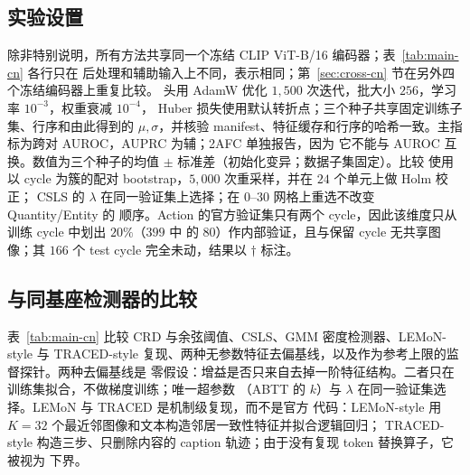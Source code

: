 \documentclass[10pt,twocolumn,a4paper]{ctexart}
\begin{document}
\subsection{实验设置}
除非特别说明，所有方法共享同一个冻结 CLIP ViT-B/16 编码器；表~\ref{tab:main-cn} 各行只在
后处理和辅助输入上不同，表示相同；第~\ref{sec:cross-cn} 节在另外四个冻结编码器上重复比较。
头用 AdamW 优化 $1{,}500$ 次迭代，批大小 $256$，学习率 $10^{-3}$，权重衰减 $10^{-4}$，
Huber 损失使用默认转折点；三个种子共享固定训练子集、行序和由此得到的 $\mu,\sigma$，并核验
manifest、特征缓存和行序的哈希一致。主指标为跨对 AUROC，AUPRC 为辅；2AFC 单独报告，因为
它不能与 AUROC 互换。数值为三个种子的均值 $\pm$ 标准差（初始化变异；数据子集固定）。比较
使用以 cycle 为簇的配对 bootstrap，$5{,}000$ 次重采样，并在 $24$ 个单元上做 Holm 校正；
CSLS 的 $\lambda$ 在同一验证集上选择；在 $0$--$30$ 网格上重选不改变 Quantity/Entity 的
顺序。Action 的官方验证集只有两个 cycle，因此该维度只从训练 cycle 中划出 $20\%$（$399$ 中
的 $80$）作内部验证，且与保留 cycle 无共享图像；其 $166$ 个 test cycle 完全未动，结果以
$\dagger$ 标注。

\subsection{与同基座检测器的比较}
表~\ref{tab:main-cn} 比较 CRD 与余弦阈值、CSLS、GMM 密度检测器、LEMoN-style 与
TRACED-style 复现、两种无参数特征去偏基线，以及作为参考上限的监督探针。两种去偏基线是
零假设：增益是否只来自去掉一阶特征结构。二者只在训练集拟合，不做梯度训练；唯一超参数
（ABTT 的 $k$）与 $\lambda$ 在同一验证集选择。LEMoN 与 TRACED 是机制级复现，而不是官方
代码：LEMoN-style 用 $K{=}32$ 个最近邻图像和文本构造邻居一致性特征并拟合逻辑回归；
TRACED-style 构造三步、只删除内容的 caption 轨迹；由于没有复现 token 替换算子，它被视为
下界。
\end{document}
